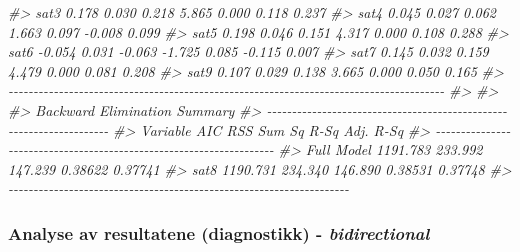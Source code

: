 \documentclass[
]{article}
\newenvironment{Shaded}{\begin{snugshade}}{\end{snugshade}}
\newcommand{\CommentTok}[1]{\textcolor[rgb]{0.56,0.35,0.01}{\textit{#1}}}
\begin{document}
\begin{Shaded}
\begin{Highlighting}[]
\CommentTok{\#\textgreater{}        sat3     0.178         0.030        0.218     5.865    0.000     0.118    0.237 }
\CommentTok{\#\textgreater{}        sat4     0.045         0.027        0.062     1.663    0.097    {-}0.008    0.099 }
\CommentTok{\#\textgreater{}        sat5     0.198         0.046        0.151     4.317    0.000     0.108    0.288 }
\CommentTok{\#\textgreater{}        sat6    {-}0.054         0.031       {-}0.063    {-}1.725    0.085    {-}0.115    0.007 }
\CommentTok{\#\textgreater{}        sat7     0.145         0.032        0.159     4.479    0.000     0.081    0.208 }
\CommentTok{\#\textgreater{}        sat9     0.107         0.029        0.138     3.665    0.000     0.050    0.165 }
\CommentTok{\#\textgreater{} {-}{-}{-}{-}{-}{-}{-}{-}{-}{-}{-}{-}{-}{-}{-}{-}{-}{-}{-}{-}{-}{-}{-}{-}{-}{-}{-}{-}{-}{-}{-}{-}{-}{-}{-}{-}{-}{-}{-}{-}{-}{-}{-}{-}{-}{-}{-}{-}{-}{-}{-}{-}{-}{-}{-}{-}{-}{-}{-}{-}{-}{-}{-}{-}{-}{-}{-}{-}{-}{-}{-}{-}{-}{-}{-}{-}{-}{-}{-}{-}{-}{-}{-}{-}{-}{-}{-}}
\CommentTok{\#\textgreater{} }
\CommentTok{\#\textgreater{} }
\CommentTok{\#\textgreater{}                      Backward Elimination Summary                     }
\CommentTok{\#\textgreater{} {-}{-}{-}{-}{-}{-}{-}{-}{-}{-}{-}{-}{-}{-}{-}{-}{-}{-}{-}{-}{-}{-}{-}{-}{-}{-}{-}{-}{-}{-}{-}{-}{-}{-}{-}{-}{-}{-}{-}{-}{-}{-}{-}{-}{-}{-}{-}{-}{-}{-}{-}{-}{-}{-}{-}{-}{-}{-}{-}{-}{-}{-}{-}{-}{-}{-}{-}{-}}
\CommentTok{\#\textgreater{} Variable        AIC         RSS      Sum Sq      R{-}Sq      Adj. R{-}Sq }
\CommentTok{\#\textgreater{} {-}{-}{-}{-}{-}{-}{-}{-}{-}{-}{-}{-}{-}{-}{-}{-}{-}{-}{-}{-}{-}{-}{-}{-}{-}{-}{-}{-}{-}{-}{-}{-}{-}{-}{-}{-}{-}{-}{-}{-}{-}{-}{-}{-}{-}{-}{-}{-}{-}{-}{-}{-}{-}{-}{-}{-}{-}{-}{-}{-}{-}{-}{-}{-}{-}{-}{-}{-}}
\CommentTok{\#\textgreater{} Full Model    1191.783    233.992    147.239    0.38622      0.37741 }
\CommentTok{\#\textgreater{} sat8          1190.731    234.340    146.890    0.38531      0.37748 }
\CommentTok{\#\textgreater{} {-}{-}{-}{-}{-}{-}{-}{-}{-}{-}{-}{-}{-}{-}{-}{-}{-}{-}{-}{-}{-}{-}{-}{-}{-}{-}{-}{-}{-}{-}{-}{-}{-}{-}{-}{-}{-}{-}{-}{-}{-}{-}{-}{-}{-}{-}{-}{-}{-}{-}{-}{-}{-}{-}{-}{-}{-}{-}{-}{-}{-}{-}{-}{-}{-}{-}{-}{-}}
\end{Highlighting}
\end{Shaded}

\hypertarget{analyse-av-resultatene-diagnostikk---bidirectional}{%
\subsubsection{\texorpdfstring{Analyse av resultatene (diagnostikk) - \emph{bidirectional}}{Analyse av resultatene (diagnostikk) - bidirectional}}\label{analyse-av-resultatene-diagnostikk---bidirectional}}
\end{document}
